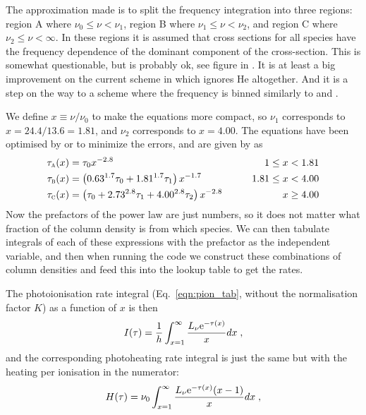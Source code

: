 \documentclass[a4paper,11pt]{article}
\begin{document}
The approximation made is to split the frequency integration into three regions: region A where $\nu_0\leq\nu<\nu_1$, region B where $\nu_1\leq\nu<\nu_2$, and region C where $\nu_2\leq\nu<\infty$.
In these regions it is assumed that cross sections for all species have the frequency dependence of the dominant component of the cross-section.
This is somewhat questionable, but is probably ok, see figure in \citet{RodTen98}.
It is at least a big improvement on the current scheme in \pion{} which ignores He altogether.
And it is a step on the way to a scheme where the frequency is binned similarly to \citet{FriMelIliEA12} and \citet{CanPor11}.

We define $x\equiv\nu/\nu_0$ to make the equations more compact, so $\nu_1$ corresponds to $x=24.4/13.6=1.81$, and $\nu_2$ corresponds to $x=4.00$.
The equations have been optimised by \citet{TenBodNor86} or \citet{FraMel94} to minimize the errors, and are given by \citet{FraMel94} as
\begin{align}
\tau_\textsc{a}(x) &= \tau_0 x^{-2.8}  \qquad &1\leq x<1.81 \nonumber \\
\tau_\textsc{b}(x) &= \left(0.63^{1.7}\tau_0+1.81^{1.7}\tau_1\right) x^{-1.7} \qquad &1.81\leq x<4.00 \nonumber \\
\tau_\textsc{c}(x) &= \left(\tau_0+2.73^{2.8}\tau_1+4.00^{2.8}\tau_2\right) x^{-2.8}  \qquad &x \geq 4.00
\end{align}
Now the prefactors of the power law are just numbers, so it does not matter what fraction of the column density is from which species.
We can then tabulate integrals of each of these expressions with the prefactor as the independent variable, and then when running the code we construct these combinations of column densities and feed this into the lookup table to get the rates.

The photoionisation rate integral (Eq.~\ref{eqn:pion_tab}, without the normalisation factor $K$) as a function of $x$ is then
\begin{equation}
I(\tau) = \frac{1}{h}\int_{x=1}^{\infty}
    \frac{L_\nu \mathrm{e}^{-\tau(x)}}{x} dx \;,
\label{eqn:pion_tab_x}
\end{equation}
and the corresponding photoheating rate integral is just the same but with the heating per ionisation in the numerator:
\begin{equation}
H(\tau) = \nu_0\int_{x=1}^{\infty}
    \frac{L_\nu \mathrm{e}^{-\tau(x)}(x-1)}{x} dx \;,
\label{eqn:pheat_tab_x}
\end{equation}
\end{document}

